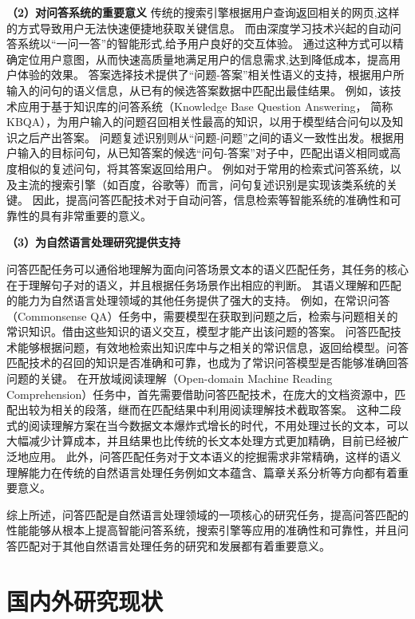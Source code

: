 \textbf{\songti（2）对问答系统的重要意义}
传统的搜索引擎根据用户查询返回相关的网页,这样的方式导致用户无法快速便捷地获取关键信息。
而由深度学习技术兴起的自动问答系统以“一问一答”的智能形式,给予用户良好的交互体验。
通过这种方式可以精确定位用户意图，从而快速高质量地满足用户的信息需求,达到降低成本，提高用户体验的效果。
答案选择技术提供了“问题-答案”相关性语义的支持，根据用户所输入的问句的语义信息，从已有的候选答案数据中匹配出最佳结果。
例如，该技术应用于基于知识库的问答系统（Knowledge Base Question Answering， 简称KBQA），为用户输入的问题召回相关性最高的知识，以用于模型结合问句以及知识之后产出答案。
问题复述识别则从“问题-问题”之间的语义一致性出发。根据用户输入的目标问句，从已知答案的候选“问句-答案”对子中，匹配出语义相同或高度相似的复述问句，将其答案返回给用户。
例如对于常用的检索式问答系统，以及主流的搜索引擎（如百度，谷歌等）而言，问句复述识别是实现该类系统的关键。
因此，提高问答匹配技术对于自动问答，信息检索等智能系统的准确性和可靠性的具有非常重要的意义。


\textbf{\songti（3）为自然语言处理研究提供支持}

问答匹配任务可以通俗地理解为面向问答场景文本的语义匹配任务，其任务的核心在于理解句子对的语义，并且根据任务场景作出相应的判断。
其语义理解和匹配的能力为自然语言处理领域的其他任务提供了强大的支持。
例如，在常识问答（Commonsense QA）任务中，需要模型在获取到问题之后，检索与问题相关的常识知识。借由这些知识的语义交互，模型才能产出该问题的答案。
问答匹配技术能够根据问题，有效地检索出知识库中与之相关的常识信息，返回给模型。问答匹配技术的召回的知识是否准确和可靠，也成为了常识问答模型是否能够准确回答问题的关键。
在开放域阅读理解（Open-domain Machine Reading Comprehension）任务中，首先需要借助问答匹配技术，在庞大的文档资源中，匹配出较为相关的段落，继而在匹配结果中利用阅读理解技术截取答案。
这种二段式的阅读理解方案在当今数据文本爆炸式增长的时代，不用处理过长的文本，可以大幅减少计算成本，并且结果也比传统的长文本处理方式更加精确，目前已经被广泛地应用。
此外，问答匹配任务对于文本语义的挖掘需求非常精确，这样的语义理解能力在传统的自然语言处理任务例如文本蕴含、篇章关系分析等方向都有着重要意义。

综上所述，问答匹配是自然语言处理领域的一项核心的研究任务，提高问答匹配的性能能够从根本上提高智能问答系统，搜索引擎等应用的准确性和可靠性，并且问答匹配对于其他自然语言处理任务的研究和发展都有着重要意义。

\section{国内外研究现状}


